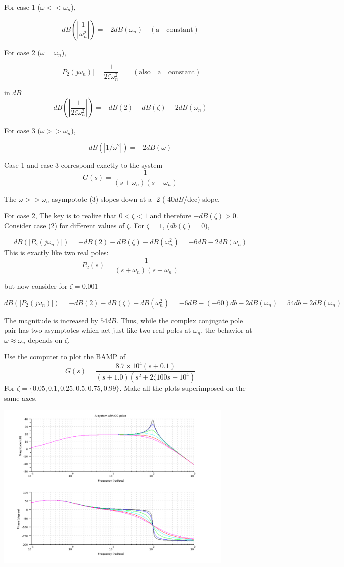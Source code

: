 For case 1 ($\omega << \omega_n$),

\[
dB(|\frac{1}{\omega_n^2}|) = -2dB(\omega_n) \quad \mathrm{(a\quad constant)}
\]

For case 2 ($\omega =  \omega_n$),

\[
|P_2(j\omega_n)| =  \frac {1}  {2\zeta \omega_n^2} \qquad \mathrm{(also\quad a\quad constant)}
\]

in $dB$
\[
dB(| \frac {1}  {2\zeta \omega_n^2} |) =  -dB(2) -dB(\zeta) -2dB(\omega_n)
\]

For case 3 ($\omega >>  \omega_n$),

\[
dB(|1/\omega^2|) = -2dB(\omega)
\]

Case 1 and case 3 correspond exactly to the system
\[
G(s) = \frac {1}{(s+\omega_n)(s+\omega_n)}
\]


The $\omega >> \omega_n$ asympotote (3) slopes down at a -2 (-40$dB$/dec) slope.


For case 2, The key is to realize that $0<\zeta<1$ and therefore $-dB(\zeta) > 0$.
Consider case (2) for different values of $\zeta$.  For $\zeta = 1$, ($db(\zeta)=0$),

\[
dB(|P_2(j\omega_n)|) =  -dB(2) -dB(\zeta) -dB(\omega_n^2) = -6dB -2 dB(\omega_n)
\]
This is exactly like two real poles:
\[
P_2(s) = \frac {1}{(s+\omega_n)(s+\omega_n)}
\]

but now consider for $\zeta= 0.001$

\[
dB(|P_2(j\omega_n)|) =  -dB(2) -dB(\zeta) -dB(\omega_n^2) = -6dB -(-60)db -2 dB(\omega_n) = 54db-2dB(\omega_n)
\]

The magnitude is increased by $54dB$.   Thus, while the complex conjugate pole pair has two asymptotes which act just like two real poles at $\omega_n$, the behavior at $\omega \approx \omega_n$ depends on $\zeta$.

\begin{ExampleSmall}

Use the computer to plot the BAMP of
\[
G(s) =  \frac{8.7\times10^4(s+0.1)}    {(s+1.0)(s^2 + 2\zeta100s + 10^4)}
\]
For $\zeta = \{0.05, 0.1, 0.25, 0.5, 0.75, 0.99\}$.  Make all the plots superimposed on the same axes.


\includegraphics[width=4.5in]{figs05/zetasbodea.png}

\end{ExampleSmall}

